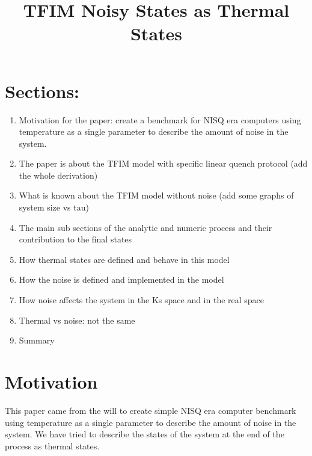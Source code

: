 \documentclass{article}
\title{TFIM Noisy States as Thermal States}
\begin{document}
\maketitle

\section*{Sections:}
\begin{enumerate}
    \item Motivation for the paper: create a benchmark for NISQ era computers using temperature as a single parameter to describe the amount of noise in the system.
    \item The paper is about the TFIM model with specific linear quench protocol (add the whole derivation)
    \item What is known about the TFIM model without noise (add some graphs of system size vs tau)
    \item The main sub sections of the analytic and numeric process and their contribution to the final states
    \item How thermal states are defined and behave in this model
    \item How the noise is defined and implemented in the model
    \item How noise affects the system in the Ks space and in the real space
    \item Thermal vs noise: not the same
    \item Summary
\end{enumerate}

\section*{Motivation}
This paper came from the will to create simple NISQ era computer benchmark using temperature as a single parameter to describe the amount of noise in the system. We have tried to describe the states of the system at the end of the process as thermal states.
\end{document}

